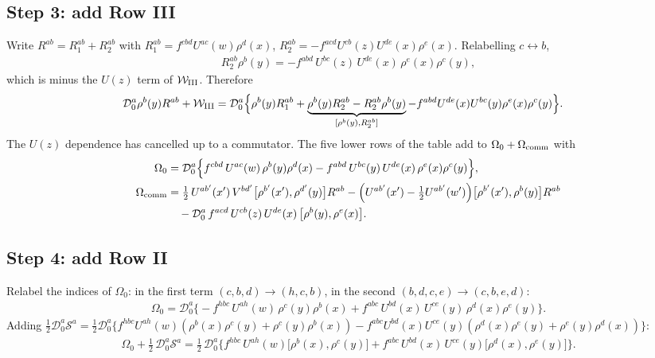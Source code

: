 \documentclass[10pt]{article}
\numberwithin{equation}{section}
\begin{document}
\subsection{Step 3: add Row III}
Write $R^{ab}=R_{1}^{ab}+R_{2}^{ab}$ with $R_{1}^{ab}=f^{cbd}U^{ac}(w)\rho^{d}(x)$, $R_{2}^{ab}=-f^{acd}U^{cb}(z)U^{de}(x)\rho^{e}(x)$. Relabelling $c\leftrightarrow b$,
\begin{align}
R_{2}^{ab}\rho^{b}(y)=-f^{abd}\,U^{bc}(z)\,U^{de}(x)\,\rho^{e}(x)\rho^{c}(y),
\end{align}
which is minus the $U(z)$ term of $\mathcal{W}_{\rm III}$. Therefore
\begin{align}
\mathcal{D}_{0}^{a}\rho^{b}(y)R^{ab}+\mathcal{W}_{\rm III}
&=\mathcal{D}_{0}^{a}\Big\{\rho^{b}(y)R_{1}^{ab}+\underbrace{\rho^{b}(y)R_{2}^{ab}-R_{2}^{ab}\rho^{b}(y)}_{[\rho^{b}(y),R_{2}^{ab}]}-f^{abd}U^{de}(x)U^{bc}(y)\rho^{e}(x)\rho^{c}(y)\Big\}.
\end{align}
The $U(z)$ dependence has cancelled up to a commutator. The five lower rows of the table add to $\Omega_{0}+\Omega_{\rm comm}$ with
\begin{align}
\Omega_{0}&=\mathcal{D}_{0}^{a}\Big\{f^{cbd}\,U^{ac}(w)\,\rho^{b}(y)\rho^{d}(x)-f^{abd}\,U^{bc}(y)\,U^{de}(x)\,\rho^{e}(x)\rho^{c}(y)\Big\},\\
\Omega_{\rm comm}&=\tfrac12\,U^{ab'}(x')\,V^{bd'}\big[\rho^{b'}(x'),\rho^{d'}(y)\big]R^{ab}
-\Big(U^{ab'}(x')-\tfrac12U^{ab'}(w')\Big)\big[\rho^{b'}(x'),\rho^{b}(y)\big]R^{ab}\notag\\
&\quad-\mathcal{D}_{0}^{a}\,f^{acd}\,U^{cb}(z)\,U^{de}(x)\,\big[\rho^{b}(y),\rho^{e}(x)\big].
\end{align}

\subsection{Step 4: add Row II}
Relabel the indices of $\Omega_{0}$: in the first term $(c,b,d)\to(h,c,b)$, in the second $(b,d,c,e)\to(c,b,e,d)$:
\begin{align}
\Omega_{0}=\mathcal{D}_{0}^{a}\Big\{-f^{hbc}\,U^{ah}(w)\,\rho^{c}(y)\rho^{b}(x)+f^{abc}\,U^{bd}(x)\,U^{ce}(y)\,\rho^{d}(x)\rho^{e}(y)\Big\}.
\end{align}
Adding $\tfrac12\mathcal{D}_{0}^{a}\mathcal{S}^{a}=\tfrac12\mathcal{D}_{0}^{a}\{f^{hbc}U^{ah}(w)(\rho^{b}(x)\rho^{c}(y)+\rho^{c}(y)\rho^{b}(x))-f^{abc}U^{bd}(x)U^{ce}(y)(\rho^{d}(x)\rho^{e}(y)+\rho^{e}(y)\rho^{d}(x))\}$:
\begin{align}
\Omega_{0}+\tfrac12\,\mathcal{D}_{0}^{a}\mathcal{S}^{a}=\tfrac12\,\mathcal{D}_{0}^{a}\Big\{f^{hbc}\,U^{ah}(w)\big[\rho^{b}(x),\rho^{c}(y)\big]+f^{abc}\,U^{bd}(x)\,U^{ce}(y)\big[\rho^{d}(x),\rho^{e}(y)\big]\Big\}.
\end{align}
\end{document}
